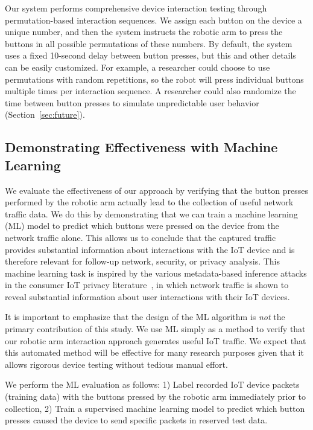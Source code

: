 Our system performs comprehensive device interaction testing through permutation-based interaction sequences. We assign each button on the device a unique number, and then the system instructs the robotic arm to press the buttons in all possible permutations of these numbers. 
By default, the system uses a fixed 10-second delay between button presses, but this and other details can be easily customized. For example, a researcher could choose to use permutations with random repetitions, so the robot will press individual buttons multiple times per interaction sequence. A researcher could also randomize the time between button presses to simulate unpredictable user behavior (Section~\ref{sec:future}). 

\subsection{Demonstrating Effectiveness with Machine Learning}
\label{sec:mlmethod}

We evaluate the effectiveness of our approach by verifying that the button presses performed by the robotic arm actually lead to the collection of useful network traffic data. We do this by demonstrating that we can train a machine learning (ML) model to predict which buttons were pressed on the device from the network traffic alone. This allows us to conclude that the captured traffic provides substantial information about interactions with the IoT device and is therefore relevant for follow-up network, security, or privacy analysis. This machine learning task is inspired by the various metadata-based inference attacks in the consumer IoT privacy literature~\cite{apthorpe2019keeping, acar2020peek, trimananda2020packet}, in which network traffic is shown to reveal substantial information about user interactions with their IoT devices.

It is important to emphasize that the design of the ML algorithm is \textit{not} the primary contribution of this study. We use ML simply as a method to verify that our robotic arm interaction approach generates useful IoT traffic. We expect that this automated method will be effective for many research purposes given that it allows rigorous device testing without tedious manual effort. 

We perform the ML evaluation as follows: 1) Label recorded IoT device packets (training data) with the buttons pressed by the robotic arm immediately prior to collection, 2) Train a supervised machine learning model to predict which button presses caused the device to send specific packets in reserved test data.

